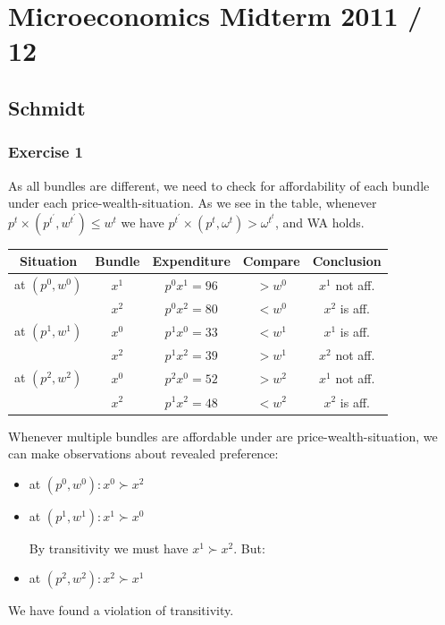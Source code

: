 \section{Microeconomics Midterm 2011 / 12}

{
\subsection*{Schmidt}

\subsubsection*{Exercise 1}

\begin{enumerate}[label=(\alph*)]
{\item 
As all bundles are different, we need to check for affordability of each bundle under each price-wealth-situation.
As we see in the table, whenever $p^t \times\left(p^{t^{\prime}}, w^{t^{\prime}}\right) \leq w^t$ we have $p^{t^{\prime}} \times\left(p^t, \omega^t\right)>\omega^{t^t}$, and WA holds.

\begin{table}[h!]
    \centering
    \begin{tabular}{c|c|c|c|c}
        Situation & Bundle & Expenditure & Compare & Conclusion \\\hline
        at $\left(p^0, w^0\right)$ & $x^1$ & $p^0 x^1=96$ & $>w^0$ & $x^1$ not aff. \\
        & $x^2$ & $p^0 x^2=80$ & $<w^0$ & $x^2$ is aff. \\
        at $\left(p^1, w^1\right)$ & $x^0$ & $p^1 x^0=33$ & $<w^1$ & $x^1$ is aff. \\
        & $x^2$ & $p^1 x^2=39$ & $>w^1$ & $x^2$ not aff. \\
        at $\left(p^2, w^2\right)$ & $x^0$ & $p^2 x^0=52$ & $>w^2$ & $x^1$ not aff. \\
        & $x^2$ & $p^1 x^2=48$ & $<w^2$ & $x^2$ is aff. \\
    \end{tabular}
\end{table}
}

{\item 
Whenever multiple bundles are affordable under are price-wealth-situation, we can make observations about revealed preference:

\begin{itemize}
    \item at $\left(p^0, w^0\right): x^0 \succ x^2$
    \item at $\left(p^1, w^1\right): x^1 \succ x^0$

    By transitivity we must have $x^1 \succ x^2$. But:
    \item at $\left(p^2, w^2\right): x^2 \succ x^1$
\end{itemize}

We have found a violation of transitivity.
}
\end{enumerate}
}

